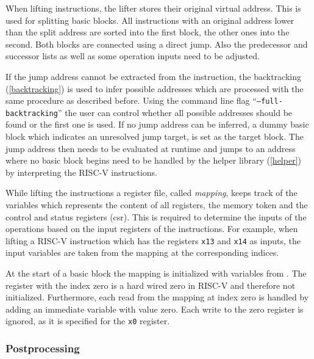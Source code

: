 \documentclass[course=eragp]{aspdoc}
\begin{document}
\par

When lifting instructions, the lifter stores their original virtual address. This is used for
splitting basic blocks. All instructions with an original address lower than the split address are
sorted into the first block, the other ones into the second. Both blocks are connected using a
direct jump. Also the predecessor and successor lists as well as some operation inputs need to be
adjusted.

\par

If the jump address cannot be extracted from the instruction, the backtracking (\ref{backtracking})
is used to infer possible addresses which are processed with the same procedure as described before.
Using the command line flag ``\texttt{--full-backtracking}'' the user can control whether all possible
addresses should be found or the first one is used. If no jump address can be inferred, a dummy
basic block which indicates an unresolved jump target, is set as the target block. The jump address then
needs to be evaluated at runtime and jumps to an address where no basic block begins need to be
handled by the helper library (\ref{helper}) by interpreting the RISC-V instructions.

\par

While lifting the instructions a register file, called \emph{mapping}, keeps track of the variables
which represents the content of all registers, the memory token and the control and status registers
(csr). This is required to determine the inputs of the operations based on the input registers of
the instructions. For example, when lifting a RISC-V instruction which has the registers \texttt{x13}
and \texttt{x14} as inputs, the input variables are taken from the mapping at the corresponding
indices.

\par

At the start of a basic block the mapping is initialized
with variables from . The register with the index zero is a hard wired zero in
RISC-V and therefore not initialized. Furthermore, each read from the mapping at index zero is handled by adding an immediate
variable with value zero. Each write to the zero register is ignored, as it is specified for the \texttt{x0}
register.\cite{rvspec}

\subsubsection{Postprocessing}
\end{document}
